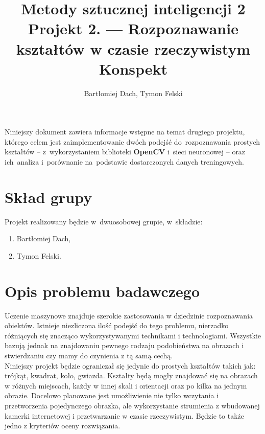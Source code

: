 \documentclass[11pt,a4paper]{article}
\begin{document}
\title{Metody sztucznej inteligencji 2 \\
\Large{
    Projekt 2. --- Rozpoznawanie kształtów w czasie rzeczywistym \\
    Konspekt
}}
\author{Bartłomiej Dach, Tymon Felski}
\maketitle

\noindent
Niniejszy dokument zawiera informacje wstępne na temat drugiego projektu, którego celem jest zaimplementowanie dwóch podejść do~rozpoznawania prostych kształtów -- z~wykorzystaniem biblioteki \textbf{OpenCV} i~sieci neuronowej -- oraz ich~analiza i~porównanie na~podstawie dostarczonych danych treningowych.

\section{Skład grupy}

Projekt realizowany będzie w~dwuosobowej grupie, w~składzie:
\begin{enumerate}
    \setlength\itemsep{-.4em}
    \item Bartłomiej Dach,
    \item Tymon Felski.
\end{enumerate}

\section{Opis problemu badawczego}

Uczenie maszynowe znajduje szerokie zastosowania w dziedzinie rozpoznawania obiektów. Istnieje niezliczona ilość podejść do tego problemu, nierzadko różniących się znacząco wykorzystywanymi technikami i technologiami. Wszystkie bazują jednak na znajdowaniu pewnego rodzaju podobieństwa na obrazach i stwierdzaniu czy mamy do czynienia z tą samą cechą.\\

Niniejszy projekt będzie ograniczał się jedynie do prostych kształtów takich jak: trójkąt, kwadrat, koło, gwiazda. Kształty będą mogły znajdować się na obrazach w różnych miejscach, każdy w innej skali i orientacji oraz po kilka na jednym obrazie. Docelowo planowane jest umożliwienie nie tylko wczytania i przetworzenia pojedynczego obrazka, ale wykorzystanie strumienia z wbudowanej kamerki internetowej i przetwarzanie w czasie rzeczywistym. Będzie to także jedno z kryteriów oceny rozwiązania.
\end{document}
